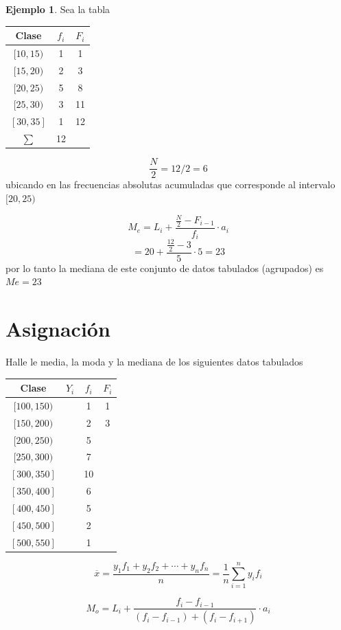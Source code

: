 \documentclass[
  11pt,
]{krantz}
\theoremstyle{definition}
\theoremstyle{definition}
\newtheorem{example}{Ejemplo}[chapter]
\theoremstyle{definition}
\theoremstyle{definition}
\theoremstyle{remark}
\begin{document}
\begin{example}
Sea la tabla

\begin{longtable}[]{@{}ccc@{}}
\toprule
Clase & \(f_i\) & \(F_i\) \\
\midrule
\endhead
\([10,15)\) & 1 & 1 \\
\([15,20)\) & 2 & 3 \\
\([20,25)\) & 5 & 8 \\
\([25,30)\) & 3 & 11 \\
\([30,35]\) & 1 & 12 \\
\(\sum\) & 12 & \\
\bottomrule
\end{longtable}

\[\frac{N}{2}=12/2=6\] ubicando en las frecuencias absolutas acumuladas que corresponde al intervalo \([20,25)\)

\[  M_e=L_{i}+\frac{\frac{N}{2}-F_{i-1}}{f_{i}}\cdot a_{i}\] \[  =20+\frac{\frac{12}{2}-3}{5}\cdot 5=23\] por lo tanto la mediana de este conjunto de datos tabulados (agrupados) es \(Me=23\)
\end{example}

\hypertarget{asignaciuxf3n}{%
\section{Asignación}\label{asignaciuxf3n}}

Halle le media, la moda y la mediana de los siguientes datos tabulados

\begin{longtable}[]{@{}cccc@{}}
\toprule
Clase & \(Y_i\) & \(f_i\) & \(F_i\) \\
\midrule
\endhead
\([100,150)\) & & 1 & 1 \\
\([150,200)\) & & 2 & 3 \\
\([200,250)\) & & 5 & \\
\([250,300)\) & & 7 & \\
\([300,350]\) & & 10 & \\
\([350,400]\) & & 6 & \\
\([400,450]\) & & 5 & \\
\([450,500]\) & & 2 & \\
\([500,550]\) & & 1 & \\
\bottomrule
\end{longtable}

\[\overline{x}=\frac{y_1f_1+y_2f_2+\cdots+y_nf_n}{n}=\frac{1}{n}\sum_{i=1}^ny_if_i\]

\[ M_o=L_i+\frac{f_i-f_{i-1}}{(f_i-f_{i-1})+(f_i-f_{i+1})}\cdot a_i\]
\end{document}
